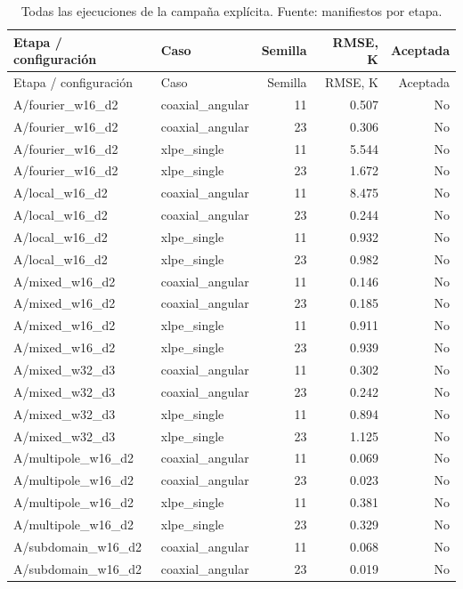 \begingroup\footnotesize\setlength{\tabcolsep}{3pt}
\begin{longtable}{L{4cm}L{3.5cm}rrr}
\caption{Todas las ejecuciones de la campaña explícita. Fuente: manifiestos por etapa.}\label{tab:explicit-all}\\
\toprule
Etapa / configuración & Caso & Semilla & RMSE, K & Aceptada\\
\midrule\endfirsthead
\toprule
Etapa / configuración & Caso & Semilla & RMSE, K & Aceptada\\
\midrule\endhead
A/fourier\_w16\_d2 & coaxial\_angular & 11 & 0.507 & No\\
A/fourier\_w16\_d2 & coaxial\_angular & 23 & 0.306 & No\\
A/fourier\_w16\_d2 & xlpe\_single & 11 & 5.544 & No\\
A/fourier\_w16\_d2 & xlpe\_single & 23 & 1.672 & No\\
A/local\_w16\_d2 & coaxial\_angular & 11 & 8.475 & No\\
A/local\_w16\_d2 & coaxial\_angular & 23 & 0.244 & No\\
A/local\_w16\_d2 & xlpe\_single & 11 & 0.932 & No\\
A/local\_w16\_d2 & xlpe\_single & 23 & 0.982 & No\\
A/mixed\_w16\_d2 & coaxial\_angular & 11 & 0.146 & No\\
A/mixed\_w16\_d2 & coaxial\_angular & 23 & 0.185 & No\\
A/mixed\_w16\_d2 & xlpe\_single & 11 & 0.911 & No\\
A/mixed\_w16\_d2 & xlpe\_single & 23 & 0.939 & No\\
A/mixed\_w32\_d3 & coaxial\_angular & 11 & 0.302 & No\\
A/mixed\_w32\_d3 & coaxial\_angular & 23 & 0.242 & No\\
A/mixed\_w32\_d3 & xlpe\_single & 11 & 0.894 & No\\
A/mixed\_w32\_d3 & xlpe\_single & 23 & 1.125 & No\\
A/multipole\_w16\_d2 & coaxial\_angular & 11 & 0.069 & No\\
A/multipole\_w16\_d2 & coaxial\_angular & 23 & 0.023 & No\\
A/multipole\_w16\_d2 & xlpe\_single & 11 & 0.381 & No\\
A/multipole\_w16\_d2 & xlpe\_single & 23 & 0.329 & No\\
A/subdomain\_w16\_d2 & coaxial\_angular & 11 & 0.068 & No\\
A/subdomain\_w16\_d2 & coaxial\_angular & 23 & 0.019 & No\\

\end{longtable}
